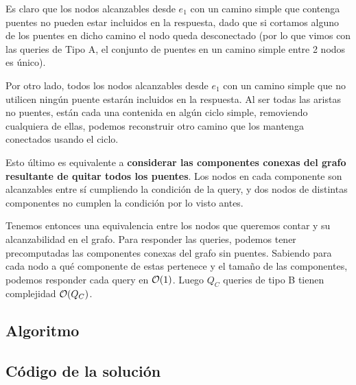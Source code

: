 Es claro que los nodos alcanzables desde $e_1$ con un camino simple que contenga 
puentes no pueden estar incluidos en la respuesta, dado que si cortamos alguno de los puentes en 
dicho camino el nodo queda desconectado (por lo que vimos con las queries de Tipo A, el 
conjunto de puentes en un camino simple entre 2 nodos es único). 

Por otro lado, todos los nodos alcanzables desde $e_1$ con un camino simple que no 
utilicen ningún puente estarán incluidos en la respuesta. 
Al ser todas las aristas no puentes, están cada una contenida en 
algún ciclo simple, removiendo cualquiera de ellas, podemos reconstruir otro camino que 
los mantenga conectados usando el ciclo. 

Esto último es equivalente a \textbf{considerar las componentes conexas del grafo resultante 
de quitar todos los puentes}. Los nodos en cada componente son alcanzables entre sí 
cumpliendo la condición de la query, y dos nodos de distintas componentes no cumplen 
la condición por lo visto antes. 

Tenemos entonces una equivalencia entre los nodos que queremos contar y su alcanzabilidad 
en el grafo. Para responder las queries, podemos tener precomputadas las componentes conexas 
del grafo sin puentes. Sabiendo para cada nodo a qué componente de estas pertenece y el tamaño 
de las componentes, podemos responder cada query en $\mathcal{O}(1)$. Luego $Q_C$ queries 
de tipo B tienen complejidad $\mathcal{O}(Q_C)$. \\

\subsection{Algoritmo}
\newpage
\subsection{Código de la solución}

